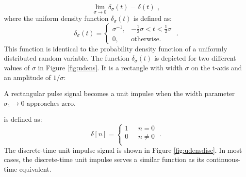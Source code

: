 \begin{equation}
    \lim_{\sigma \rightarrow 0} \delta_{\sigma}(t) = \delta(t)\,\,,
\end{equation}
where the uniform density function $\delta_{\sigma}(t)$ is defined as:
\begin{equation}
\delta_{\sigma}(t) =\left\{ \begin{array}{cl}
\sigma^{-1}, & -\frac{1}{2}\sigma < t < \frac{1}{2}\sigma \\
0, & \mathrm{otherwise}. \end{array}
\right.\,\,.
\end{equation}
This function is identical to the probability density function of a
uniformly distributed random variable. The function
$\delta_{\sigma}(t)$ is depicted for two different values of $\sigma$
in Figure \ref{fig:udens}. It is a rectangle with width $\sigma$ on
the t-axis and an amplitude of $1/\sigma$:
\begin{marginfigure}
\begin{center}
\end{center}
\caption{A rectangular pulse signal becomes a unit impulse when the width parameter $\sigma_1 \rightarrow 0$ approaches zero.}
\label{fig:udens}
\end{marginfigure}
\fi


 is defined as:
\begin{equation}
\delta[n] = \left\{\begin{array}{cl}
1 &~~~ n = 0 \\
0 &~~~ n \ne 0 \\
\end{array}
\right.\,\,.
\end{equation}
The discrete-time unit impulse signal is shown in
Figure \ref{fig:udensdisc}. In most cases, the discrete-time unit
impulse serves a similar function as its continuous-time equivalent.


